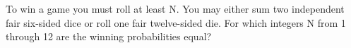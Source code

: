 To win a game you must roll at least N. You may either sum two independent fair six-sided dice or roll one fair twelve-sided die. For which integers N from 1 through 12 are the winning probabilities equal?
